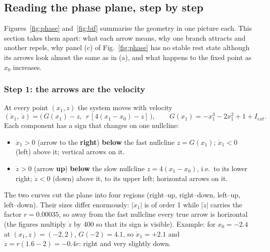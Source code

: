 \documentclass[11pt]{article}
\begin{document}
\subsection{Reading the phase plane, step by step}\label{sec:pp}
Figures~\ref{fig:phase} and~\ref{fig:bif} summarise the geometry in one picture each. This section takes them apart: what
each arrow means, why one branch attracts and another repels, why panel (c) of Fig.~\ref{fig:phase} has no stable rest
state although its arrows look almost the same as in (a), and what happens to the fixed point as $x_0$ increases.

\subsubsection*{Step 1: the arrows are the velocity}
At every point $(x_1, z)$ the system moves with velocity
\[
(\dot x_1,\ \dot z) = \big(\,G(x_1) - z,\ \ r\,[4(x_1 - x_0) - z]\,\big),\qquad G(x_1) = -x_1^3 - 2x_1^2 + 1 + I_{ext}.
\]
Each component has a sign that changes on one nullcline:
\begin{itemize}
\item $\dot x_1>0$ (arrow to the \textbf{right}) \textbf{below} the fast nullcline $z = G(x_1)$; $\dot x_1<0$ (left)
above it; vertical arrows on it.
\item $\dot z>0$ (arrow \textbf{up}) \textbf{below} the slow nullcline $z = 4(x_1 - x_0)$, i.e.\ to its lower right;
$\dot z<0$ (down) above it, to its upper left; horizontal arrows on it.
\end{itemize}
The two curves cut the plane into four regions (right--up, right--down, left--up, left--down). Their sizes differ
enormously: $|\dot x_1|$ is of order 1 while $|\dot z|$ carries the factor $r = 0.00035$, so away from the fast
nullcline every true arrow is horizontal (the figures multiply $\dot z$ by 400 so that its sign is visible). Example:
for $x_0=-2.4$ at $(x_1, z) = (-2, 2)$, $G(-2) = 4.1$, so $\dot x_1 = +2.1$ and $\dot z = r(1.6 - 2) = -0.4r$: right and
very slightly down.
\end{document}
